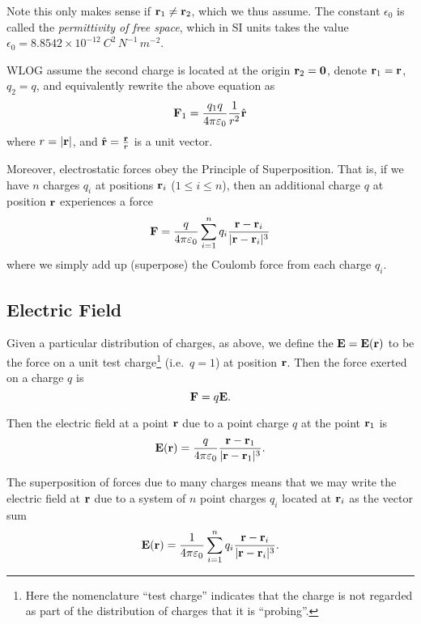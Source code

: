 Note this only makes sense if $\vb{r}_1\neq\vb{r}_2$, which we thus assume. The constant $\epsilon_0$ is called the \emph{permittivity of free space}, which in SI units takes the value $\epsilon_0=8.8542\times10^{-12}\:\unit{C^2\,N^{-1}\,m^{-2}}$.

WLOG assume the second charge is located at the origin $\vb{r}_2=\vb{0}$, denote $\vb{r}_1=\vb{r}$, $q_2=q$, and equivalently rewrite the above equation as
\begin{equation}
\vb{F}_1=\frac{q_1q}{4\pi\varepsilon_0}\frac{1}{r^2}\hat{\vb{r}}
\end{equation}
where $r=|\vb{r}|$, and $\hat{\vb{r}}=\frac{\vb{r}}{r}$ is a unit vector.

Moreover, electrostatic forces obey the Principle of Superposition. That is, if we have $n$ charges $q_i$ at positions $\vb{r}_i$ ($1\le i\le n$), then an additional charge $q$ at position $\vb{r}$ experiences a force
\[\vb{F}=\frac{q}{4\pi\varepsilon_0}\sum_{i=1}^{n}q_i\frac{\vb{r}-\vb{r}_i}{|\vb{r}-\vb{r}_i|^3}\]
where we simply add up (superpose) the Coulomb force from each charge $q_i$.

\subsection{Electric Field}
Given a particular distribution of charges, as above, we define the  $\vb{E}=\vb{E}(\vb{r})$ to be the force on a unit test charge\footnote{Here the nomenclature ``test charge'' indicates that the charge is not regarded as part of the distribution of charges that it is ``probing''.} (i.e.\ $q=1$) at position $\vb{r}$. Then the force exerted on a charge $q$ is
\[\vb{F}=q\vb{E}.\]

Then the electric field at a point $\vb{r}$ due to a point charge $q$ at the point $\vb{r}_1$ is
\begin{equation}
\vb{E}(\vb{r})=\frac{q}{4\pi\varepsilon_0}\frac{\vb{r}-\vb{r}_1}{|\vb{r}-\vb{r}_1|^3}.
\end{equation}

The superposition of forces due to many charges means that we may write the electric field at $\vb{r}$ due to a system of $n$ point charges $q_i$ located at $\vb{r}_i$ as the vector sum
\[\vb{E}(\vb{r})=\frac{1}{4\pi\varepsilon_0}\sum_{i=1}^{n}q_i \frac{\vb{r}-\vb{r}_i}{|\vb{r}-\vb{r}_i|^3}.\]

